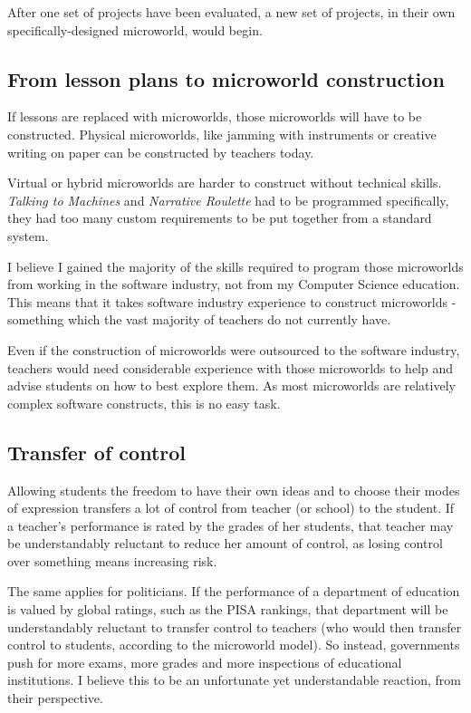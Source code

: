 After one set of projects have been evaluated, a new set of projects, in
their own specifically-designed microworld, would begin.

\subsection{From lesson plans to microworld construction}

If lessons are replaced with microworlds, those microworlds will have to
be constructed. Physical microworlds, like jamming with instruments or
creative writing on paper can be constructed by teachers today.

Virtual or hybrid microworlds are harder to construct without technical
skills. \emph{Talking to Machines} and \emph{Narrative Roulette} had to
be programmed specifically, they had too many custom requirements to be
put together from a standard system.

I believe I gained the majority of the skills required to program those
microworlds from working in the software industry, not from my Computer
Science education. This means that it takes software industry experience
to construct microworlds - something which the vast majority of teachers
do not currently have.

Even if the construction of microworlds were outsourced to the software
industry, teachers would need considerable experience with those
microworlds to help and advise students on how to best explore them. As
most microworlds are relatively complex software constructs, this is no
easy task.

\subsection{Transfer of control}

Allowing students the freedom to have their own ideas and to choose
their modes of expression transfers a lot of control from teacher (or
school) to the student. If a teacher's performance is rated by the
grades of her students, that teacher may be understandably reluctant to
reduce her amount of control, as losing control over something means
increasing risk.

The same applies for politicians. If the performance of a department of
education is valued by global ratings, such as the PISA rankings, that
department will be understandably reluctant to transfer control to
teachers (who would then transfer control to students, according to the
microworld model). So instead, governments push for more exams, more
grades and more inspections of educational institutions. I believe this
to be an unfortunate yet understandable reaction, from their
perspective.

